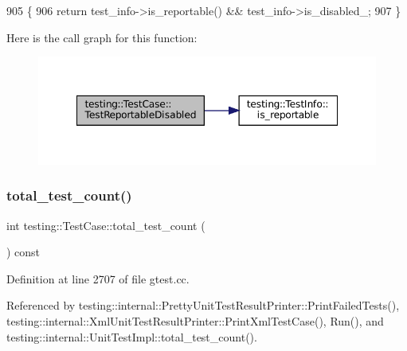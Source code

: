 \begin{DoxyCode}
905                                                                 \{
906     \textcolor{keywordflow}{return} test\_info->is\_reportable() && test\_info->is\_disabled\_;
907   \}
\end{DoxyCode}
Here is the call graph for this function\+:
\nopagebreak
\begin{figure}[H]
\begin{center}
\leavevmode
\includegraphics[width=348pt]{classtesting_1_1TestCase_a1f2da5337f941d746dfcb98bc4acc149_cgraph}
\end{center}
\end{figure}
\mbox{\label{classtesting_1_1TestCase_aba3cab19aaf7295284f0832f2cf895a3}} 
\subsubsection{\texorpdfstring{total\+\_\+test\+\_\+count()}{total\_test\_count()}}
{\footnotesize\ttfamily int testing\+::\+Test\+Case\+::total\+\_\+test\+\_\+count (\begin{DoxyParamCaption}{ }\end{DoxyParamCaption}) const}



Definition at line 2707 of file gtest.\+cc.



Referenced by testing\+::internal\+::\+Pretty\+Unit\+Test\+Result\+Printer\+::\+Print\+Failed\+Tests(), testing\+::internal\+::\+Xml\+Unit\+Test\+Result\+Printer\+::\+Print\+Xml\+Test\+Case(), Run(), and testing\+::internal\+::\+Unit\+Test\+Impl\+::total\+\_\+test\+\_\+count().


